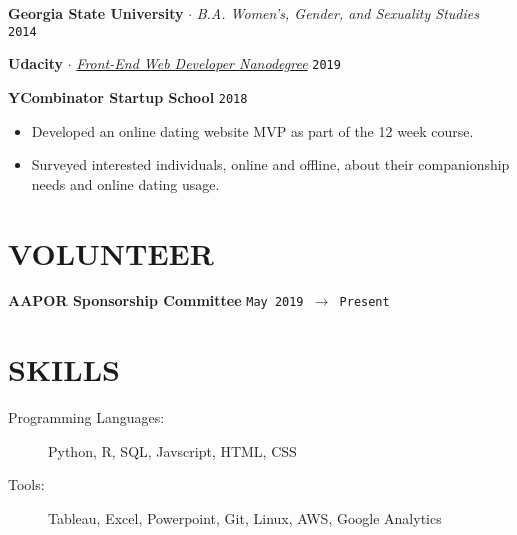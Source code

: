 \documentclass[margin, line, 11pt]{res}
\begin{document}
\begin{resume}
{\bf Georgia State University} $\cdot$ {\it B.A. Women's, Gender, and Sexuality Studies} \hfill \texttt{2014}

{\bf Udacity} $\cdot$ {\it \href{https://confirm.udacity.com/VUHFGNF6}{Front-End Web Developer Nanodegree}} \hfill \texttt{2019}

{\bf YCombinator Startup School} \hfill \texttt{2018}
\begin{itemize}
\item Developed an online dating website MVP as part of the 12 week course. 
\item Surveyed interested individuals, online and offline, about their companionship needs and online dating usage.
\end{itemize}

\section{VOLUNTEER}

{\bf AAPOR Sponsorship Committee} \hfill\texttt{May 2019 $\to$ Present}

\section{SKILLS}
\begin{description}
\item[Programming Languages:] Python, R, SQL, Javscript, HTML, CSS
\item[Tools:] Tableau, Excel, Powerpoint, Git, Linux, AWS, Google Analytics
\end{description}


\end{resume}
\end{document}
